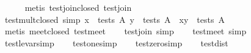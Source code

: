 \begin{isabellebody}
%
\isadelimproof
\ \ \ \ %
\endisadelimproof
%
\isatagproof
{}\isamarkupfalse%
\ {}metis\ test{}join{}closed\ test{}join{}%
\endisatagproof
{\isafoldproof}%
%
\isadelimproof
\isanewline
%
\endisadelimproof
\isanewline
\ \ \isamarkupfalse%
\ test{}mult{}closed\ {}simp{}{}\ {}{}x\ {}\ tests\ A{}\ y\ {}\ tests\ A{}\ {}\ x{}y\ {}\ tests\ A{}\isanewline
%
\isadelimproof
\ \ \ \ %
\endisadelimproof
%
\isatagproof
{}\isamarkupfalse%
\ {}metis\ meet{}closed\ test{}meet{}%
\endisatagproof
{\isafoldproof}%
%
\isadelimproof
\isanewline
%
\endisadelimproof
\isanewline
\ \ \isamarkupfalse%
\ test{}join\ {}simp{}\isanewline
\ \ \isamarkupfalse%
\ test{}meet\ {}simp{}\isanewline
\ \ \isamarkupfalse%
\ test{}le{}var{}simp{}\isanewline
\ \ \isamarkupfalse%
\ test{}one{}simp{}\isanewline
\ \ \isamarkupfalse%
\ test{}zero{}simp{}\isanewline
\isanewline
\ \ \isamarkupfalse%
\ test{}dist{}{}\isanewline

\end{isabellebody}
